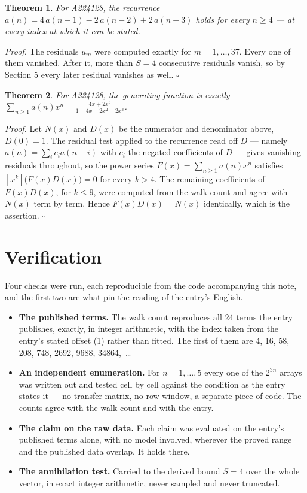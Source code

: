\documentclass[11pt]{article}
\newtheorem{theorem}{Theorem}
\theoremstyle{definition}
\begin{document}
\begin{theorem} For A224128, the recurrence $a(n) = 4\,a(n-1) - 2\,a(n-2) + 2\,a(n-3)$ holds for every $n \ge 4$ --- at every index at which it can be stated.\end{theorem}

{\itshape Proof.} The residuals $u_m$ were computed exactly for $m = 1,\dots,37$. Every one of them vanished. After it, more than $S = 4$ consecutive residuals vanish, so by Section 5 every later residual vanishes as well. $\square$

\begin{theorem} For A224128, the generating function is exactly $\sum_{n\ge 1} a(n)x^n = \frac{4x + 2x^{3}}{1 - 4x + 2x^{2} - 2x^{3}}$.\end{theorem}

{\itshape Proof.} Let $N(x)$ and $D(x)$ be the numerator and denominator above, $D(0)=1$. The residual test applied to the recurrence read off $D$ --- namely $a(n) = \sum_i c_i a(n-i)$ with $c_i$ the negated coefficients of $D$ --- gives vanishing residuals throughout, so the power series $F(x)=\sum_{n\ge 1}a(n)x^n$ satisfies $[x^k]\bigl(F(x)D(x)\bigr) = 0$ for every $k > 4$. The remaining coefficients of $F(x)D(x)$, for $k \le 9$, were computed from the walk count and agree with $N(x)$ term by term. Hence $F(x)D(x) = N(x)$ identically, which is the assertion. $\square$

\section{Verification}

Four checks were run, each reproducible from the code accompanying this note, and the first two are what pin the reading of the entry's English.

\begin{itemize}

\item {\bfseries The published terms.} The walk count reproduces all 24 terms the entry publishes, exactly, in integer arithmetic, with the index taken from the entry's stated offset (1) rather than fitted. The first of them are 4, 16, 58, 208, 748, 2692, 9688, 34864,~\dots

\item {\bfseries An independent enumeration.} For $n = 1,\dots,5$ every one of the $2^{3n}$ arrays was written out and tested cell by cell against the condition as the entry states it --- no transfer matrix, no row window, a separate piece of code. The counts agree with the walk count and with the entry.

\item {\bfseries The claim on the raw data.} Each claim was evaluated on the entry's published terms alone, with no model involved, wherever the proved range and the published data overlap. It holds there.

\item {\bfseries The annihilation test.} Carried to the derived bound $S = 4$ over the whole vector, in exact integer arithmetic, never sampled and never truncated.

\end{itemize}
\end{document}
